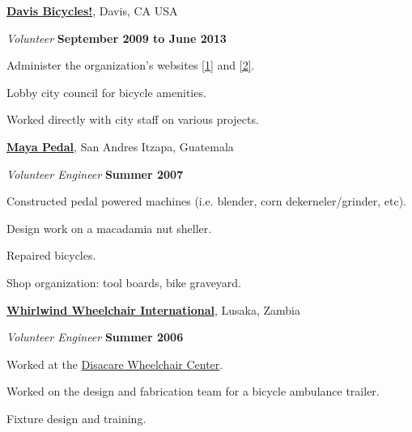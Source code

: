 \documentclass[10pt]{article}
\newenvironment{outerlist}[1][\enskip\textbullet]%
        {\begin{itemize}[#1]}{\end{itemize}%
         \vspace{-.6\baselineskip}}
\newenvironment{innerlist}[1][\enskip\textbullet]%
        {\begin{compactitem}[#1]}{\end{compactitem}}
\newcommand{\blankline}{\quad\pagebreak[2]}
\begin{document}
\blankline

\href{http://www.davisbicycles.org}{\textbf{Davis Bicycles!}}, Davis, CA USA
\begin{outerlist}
  \item[] \textit{Volunteer}%
    \hfill \textbf{September 2009 to June 2013}
  \begin{innerlist}
    \item Administer the organization's websites
      \href{http://www.davisbicycles.org}{[1]} and
      \href{http://www.bikedavis.info}{[2]}.
    \item Lobby city council for bicycle amenities.
    \item Worked directly with city staff on various projects.
  \end{innerlist}
\end{outerlist}

\blankline

\href{http://www.mayapedal.org/}{\textbf{Maya Pedal}}, San Andres Itzapa, Guatemala
\begin{outerlist}
  \item[] \textit{Volunteer Engineer}%
    \hfill \textbf{Summer 2007}
  \begin{innerlist}
    \item Constructed pedal powered machines (i.e. blender, corn
      dekerneler/grinder, etc).
    \item Design work on a macadamia nut sheller.
    \item Repaired bicycles.
    \item Shop organization: tool boards, bike graveyard.
  \end{innerlist}
\end{outerlist}

\blankline

\href{http://www.whirlwindwheelchair.org/}{\textbf{Whirlwind Wheelchair
International}}, Lusaka, Zambia
\begin{outerlist}
  \item[] \textit{Volunteer Engineer}%
    \hfill \textbf{Summer 2006}
  \begin{innerlist}
    \item Worked at the \href{http://www.disacare.org.zm/}{Disacare Wheelchair
      Center}.
    \item Worked on the design and fabrication team for a bicycle ambulance
      trailer.
    \item Fixture design and training.
  \end{innerlist}
\end{outerlist}
\end{document}
